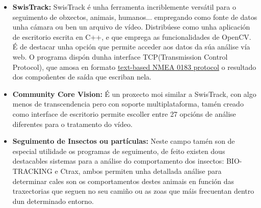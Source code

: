         \begin{itemize}
         \item \textbf{SwisTrack:}\cite{SwisTrack-webPage}
            SwisTrack é unha ferramenta incriblemente versátil para o seguimento de obxectos, 
            animais, humanos... empregando como fonte de datos unha cámara ou ben un arquivo de 
            vídeo. Distribúese como unha aplicación de escritorio escrita en C++, e que emprega as 
            funcionalidades de OpenCV.
            É de destacar unha opción que permite acceder aos datos da súa análise vía web. O 
            programa dispón dunha interface TCP(Transmission Control Protocol), que amosa en formato
            \underline{text-based NMEA 0183 protocol} o resultado dos compoñentes de saída que 
            escriban nela.
            
         \item \textbf{Community Core Vision:}\cite{ccv-webPage}
            É un proxecto moi similar a SwisTrack, con algo menos de transcendencia pero con 
            soporte multiplataforma, tamén creado como interface de escritorio permite escoller 
            entre 27 opcións de análise diferentes para o tratamento do vídeo.
            
        \item \textbf{Seguimento de Insectos ou partículas:}
            Neste campo tamén son de especial utilidade os programas de seguimento, de feito existen 
            dous destacables sistemas para a análise do comportamento dos insectos: BIO-TRACKING
            \cite{bio-tracking-webPage} e Ctrax\cite{ctrax-webPage}, ambos permiten unha detallada
            análise para determinar cales son os comportamentos destes animais en función das
            traxectorias que seguen no seu camiño ou as zoas que máis frecuentan dentro dun
            determinado entorno.
        \end{itemize}
